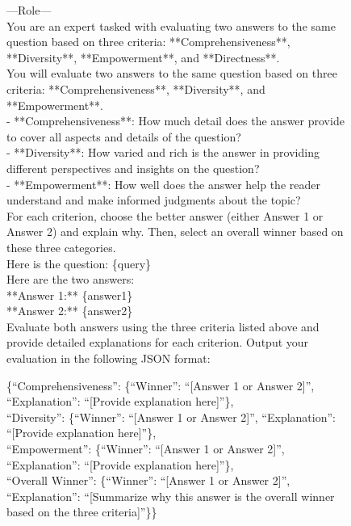 \documentclass[11pt]{article}
\begin{document}
\begin{figure}[h]
\centering
\small
\begin{tcolorbox}[title=Prompt of evaluation, colframe=gray, colback=white]
    ---Role---\\
    You are an expert tasked with evaluating two answers to the same question based on three criteria: **Comprehensiveness**, **Diversity**, **Empowerment**, and **Directness**.\\
    You will evaluate two answers to the same question based on three criteria: **Comprehensiveness**, **Diversity**, and **Empowerment**.\\
    - **Comprehensiveness**: How much detail does the answer provide to cover all aspects and details of the question?\\
    - **Diversity**: How varied and rich is the answer in providing different perspectives and insights on the question?\\
    - **Empowerment**: How well does the answer help the reader understand and make informed judgments about the topic?\\
    For each criterion, choose the better answer (either Answer 1 or Answer 2) and explain why. Then, select an overall winner based on these three categories.\\
    Here is the question: \{query\}\\
    Here are the two answers: \\
    **Answer 1:** \{answer1\}\\
    **Answer 2:** \{answer2\}\\

    Evaluate both answers using the three criteria listed above and provide detailed explanations for each criterion.
    Output your evaluation in the following JSON format:

    \{``Comprehensiveness'': \{``Winner'': ``[Answer 1 or Answer 2]'', ``Explanation'': ``[Provide explanation here]''\}, \\
        \hspace*{0.5em}``Diversity'': \{``Winner'': ``[Answer 1 or Answer 2]'', ``Explanation'': ``[Provide explanation here]''\}, \\
        \hspace*{0.5em}``Empowerment'': \{``Winner'': ``[Answer 1 or Answer 2]'', ``Explanation'': ``[Provide explanation here]''\}, \\
        \hspace*{0.5em}``Overall Winner'': \{``Winner'': ``[Answer 1 or Answer 2]'', ``Explanation'': ``[Summarize why this answer is the overall winner based on the three criteria]''\}\}


\end{tcolorbox}
\end{figure}
\end{document}
